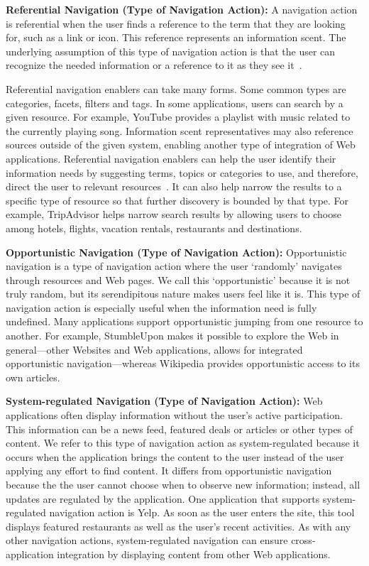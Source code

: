 \documentclass[review]{elsarticle}
\newcommand{\feature}[1]{{\ttfamily#1}}
\begin{document}
{\textbf{Referential Navigation (Type of Navigation Action):}
A navigation action is referential when the user finds a reference to the term that they are looking for, such as a link or icon. This reference represents an information scent. The underlying assumption of this type of navigation action is that the user can recognize the needed information or a reference to it as they see it~\cite{waterworth1991model}. 

Referential navigation enablers can take many forms. Some common types are \feature{categories}, \feature{facets}, \feature{filters} and \feature{tags}. In some applications, users can search by a given \feature{resource}. For example, YouTube provides a playlist with music related to the currently playing song. Information scent representatives may also reference sources outside of the given system, enabling another type of \feature{integration} of Web applications. 
%
Referential navigation enablers can help the user identify their information needs by suggesting terms, topics or categories to use, and therefore, direct the user to relevant resources~\cite{levene2011introduction}. It can also help narrow the results to a specific type of resource so that further discovery is bounded by that type. For example, TripAdvisor helps narrow search results by allowing users to choose among hotels, flights, vacation rentals, restaurants and destinations.

\textbf{Opportunistic Navigation (Type of Navigation Action):}
Opportunistic navigation is a type of navigation action where the user `randomly' navigates through resources and Web pages. We call this `opportunistic' because it is not truly random, but its serendipitous nature makes users feel like it is. This type of navigation action is especially useful when the information need is fully undefined.
%
Many applications support opportunistic jumping from one resource to another. For example, StumbleUpon makes it possible to explore the Web in general---other Websites and Web applications, allows for \feature{integrated} opportunistic navigation---whereas Wikipedia provides opportunistic access to its own articles. 


\textbf{System-regulated Navigation (Type of Navigation Action):}
Web applications often display information without the user's active participation. This information can be a \feature{news feed}, \feature{featured} deals or articles or other types of content. We refer to this type of navigation action as system-regulated because it occurs when the application brings the content to the user instead of the user applying any effort to find content. It differs from opportunistic navigation because the the user cannot choose when to observe new information; instead, all updates are regulated by the application. 
%
One application that supports system-regulated navigation action is Yelp. As soon as the user enters the site, this tool displays featured restaurants as well as the user's recent activities. As with any other navigation actions, system-regulated navigation can ensure cross-application \feature{integration} by displaying content from other Web applications. 


}
\end{document}
